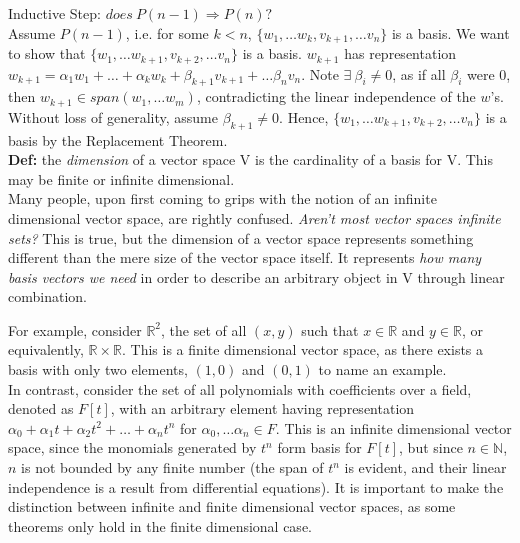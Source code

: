 \documentclass[12pt]{article}
\begin{document}
Inductive Step: $does\ P(n-1) \Rightarrow P(n)?$\\
Assume $P(n - 1)$, i.e. for some $k < n$, $\{ w_1, \dots w_k, v_{k + 1}, \dots v_n \}$ is a basis. We want to show that $\{ w_1, \dots w_{k + 1}, v_{k + 2}, \dots v_n \}$ is a basis. $w_{k + 1}$ has representation $w_{k + 1} = \alpha_1 w_1 + \dots + \alpha_k w_k + \beta_{k + 1} v_{k + 1} + \dots \beta_{n} v_n$. Note $\exists\ \beta_i \neq 0$, as if all $\beta_i$ were $0$, then $w_{k + 1} \in span(w_1, \dots w_m)$, contradicting the linear independence of the $w$'s. Without loss of generality, assume $\beta_{k + 1} \neq 0$. Hence, $\{ w_1, \dots w_{k + 1}, v_{k + 2}, \dots v_n \}$ is a basis by the Replacement Theorem.\\

\textbf{Def: }the \emph{dimension} of a vector space V is the cardinality of a basis for V. This may be finite or infinite dimensional.\\

Many people, upon first coming to grips with the notion of an infinite dimensional vector space, are rightly confused. \emph{Aren't most vector spaces infinite sets?} This is true, but the dimension of a vector space represents something different than the mere size of the vector space itself. It represents \emph{how many basis vectors we need} in order to describe an arbitrary object in V through linear combination.

For example, consider $\mathbb{R}^2$, the set of all $(x, y)$ such that $x \in \mathbb{R}$ and $y \in \mathbb{R}$, or equivalently, $\mathbb{R} \times \mathbb{R}$. This is a finite dimensional vector space, as there exists a basis with only two elements, $(1, 0)$ and $(0, 1)$ to name an example.\\

In contrast, consider the set of all polynomials with coefficients over a field, denoted as $F[t]$, with an arbitrary element having representation $\alpha_0 + \alpha_1 t + \alpha_2 t^2 + \dots + \alpha_n t^n$ for $\alpha_0, \dots \alpha_n \in F$. This is an infinite dimensional vector space, since the monomials generated by $t^n$ form basis for $F[t]$, but since $n \in \mathbb{N}$, $n$ is not bounded by any finite number (the span of $t^n$ is evident, and their linear independence is a result from differential equations). It is important to make the distinction between infinite and finite dimensional vector spaces, as some theorems only hold in the finite dimensional case.\\
\end{document}
